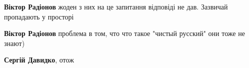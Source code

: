 \begin{itemize} %
 
\textbf{Віктор Радіонов} жоден з них на це запитання відповіді не дав. Зазвичай пропадають у просторі

 
\textbf{Віктор Радіонов} проблема в том, что что такое "чистый русский" они тоже не знают)

 
\textbf{Сергій Давидко}, отож
\end{itemize} %

